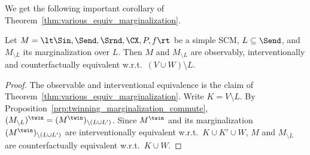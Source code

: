 We get the following important corollary of Theorem~\ref{thm:various_equiv_marginalization}.
\begin{Cor}\label{Cor:various_equiv_marginalization}
  Let $M = \lt \Sin, \Send, \Srnd, \CX, P, f \rt$ be a simple SCM, $L \subseteq \Send$, and
  $M_{\setminus L}$ its marginalization over $L$. Then $M$ and $M_{\setminus L}$ are observably,
  interventionally and counterfactually equivalent w.r.t.\ $(V \cup W) \setminus L$.
\end{Cor}
\begin{proof}
  The observable and interventional equivalence is the claim of Theorem~\ref{thm:various_equiv_marginalization}.
  Write $K = V \setminus L$.
  By Proposition~\ref{prp:twinning_marginalization_commute}, $(M_{\setminus L})^\twin = (M^\twin)_{\setminus (L \cup L')}$.
  Since $M^\twin$ and its marginalization $(M^\twin)_{\setminus (L \cup L')}$ are interventionally equivalent w.r.t.\ $K \cup K' \cup W$, $M$ and $M_{\setminus L}$ are counterfactually equivalent w.r.t.\ $K \cup W$.
\end{proof}

